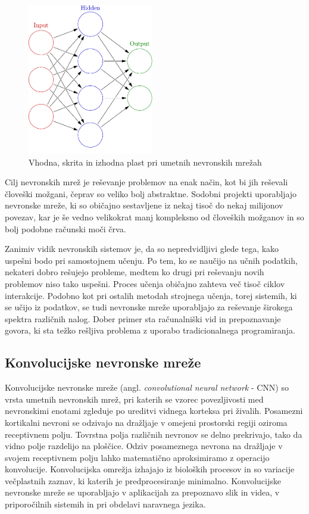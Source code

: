 \documentclass[runningheads,a4paper]{llncs}
\begin{document}
\begin{figure}[H]
\centering
\includegraphics[width=55mm]{figures/Colored_neural_network.pdf}
\caption{Vhodna, skrita in izhodna plast pri umetnih nevronskih mrežah}
\label{fig:layersANN}
\end{figure}

Cilj nevronskih mrež je reševanje problemov na enak način, kot bi jih reševali človeški možgani, čeprav so veliko bolj abstraktne. Sodobni projekti uporabljajo nevronske mreže, ki so običajno sestavljene iz nekaj tisoč do nekaj milijonov povezav, kar je še vedno velikokrat manj kompleksno od človeških možganov in so bolj podobne računski moči črva.

Zanimiv vidik nevronskih sistemov je, da so nepredvidljivi glede tega, kako uspešni bodo pri samostojnem učenju. Po tem, ko se naučijo na učnih podatkih, nekateri dobro rešujejo probleme, medtem ko drugi pri reševanju novih problemov niso tako uspešni. Proces učenja običajno zahteva več tisoč ciklov interakcije. Podobno kot pri ostalih metodah strojnega učenja, torej sistemih, ki se učijo iz podatkov, se tudi nevronske mreže uporabljajo za reševanje širokega spektra različnih nalog. Dober primer sta računalniški vid in prepoznavanje govora, ki sta težko rešljiva problema z uporabo tradicionalnega programiranja.

\subsection{Konvolucijske nevronske mreže}

Konvolucijske nevronske mreže (angl. \textit{convolutional neural network} - CNN) so vrsta umetnih nevronskih mrež, pri katerih se vzorec povezljivosti med nevronskimi enotami zgleduje po ureditvi vidnega korteksa pri živalih\cite{wiki:CNN}. Posamezni kortikalni nevroni se odzivajo na dražljaje v omejeni prostorski regiji oziroma receptivnem polju. Tovrstna polja različnih nevronov se delno prekrivajo, tako da vidno polje razdelijo na ploščice. Odziv posameznega nevrona na dražljaje v svojem receptivnem polju lahko matematično aproksimiramo z operacijo konvolucije. Konvolucijska omrežja izhajajo iz bioloških procesov in so variacije večplastnih zaznav, ki katerih je predprocesiranje minimalno. Konvolucijske nevronske mreže se uporabljajo v aplikacijah za prepoznavo slik in videa, v priporočilnih sistemih in pri obdelavi naravnega jezika.
\end{document}
